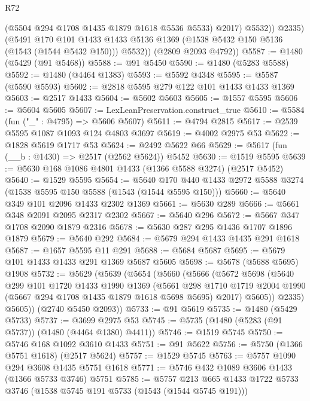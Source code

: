 \begin{lexlean}{R72}
\begin{coremodule}
                (@5504 @294 @1708 @1435 @1879 @1618 @5536 @5533)
                @2017)
              @5532))
          @2335)
        (@5491
          @170
          @101
          @1433
          @1433
          @5136
          @1369
          (@1538 @5432 @150 @5136 (@1543 (@1544 @5432 @150)))
          @5532))
      (@2809 @2093 @4792))
@5587 := @1480 (@5429 (@91 @5468))
@5588 := @91 @5450
@5590 := @1480 (@5283 @5588)
@5592 := @1480 (@4464 @1383)
@5593 := @5592 @4348
@5595 := @5587 (@5590 @5593)
@5602 := @2818 @5595 @279 @122 @101 @1433 @1433 @1369
@5603 := @2517 @1433
@5604 := @5602 @5603
@5605 := @1557 @5595
@5606 := @5604 @5605
@5607 := LexLeanPreservation.construct_true
@5610 := @5584 (fun ("_" : @4795) => @5606 @5607)
@5611 := @4794 @2815
@5617 := @2539 @5595 @1087 @1093 @124 @4803 @3697
@5619 := @4002 @2975 @53
@5622 := @1828 @5619 @1717 @53
@5624 := @2492 @5622 @66
@5629 := @5617 (fun (__b : @1430) => @2517 (@2562 @5624)) @5452
@5630 := @1519 @5595
@5639 := @5630 @168 @1086 @4801 @1433 (@1366 @5588 @3274) (@2517 @5452)
@5640 := @1529 @5595
@5654 := @5640 @170 @440 @1433 @2972 @5588 @3274 (@1538 @5595 @150 @5588 (@1543 (@1544 @5595 @150)))
@5660 := @5640 @349 @101 @2096 @1433 @2302 @1369
@5661 := @5630 @289
@5666 := @5661 @348 @2091 @2095 @2317 @2302
@5667 := @5640 @296
@5672 := @5667 @347 @1708 @2090 @1879 @2316
@5678 := @5630 @287 @295 @1436 @1707 @1896 @1879
@5679 := @5640 @292
@5684 := @5679 @294 @1433 @1435 @291 @1618
@5687 := @1657 @5595 @11 @291
@5688 := @5684 @5687
@5695 := @5679 @101 @1433 @1433 @291 @1369 @5687 @5605
@5698 := @5678 (@5688 @5695) @1908
@5732 := @5629
    (@5639
      (@5654
        (@5660
          (@5666
            (@5672
              @5698
              (@5640
                @299
                @101
                @1720
                @1433
                @1990
                @1369
                (@5661
                  @298
                  @1710
                  @1719
                  @2004
                  @1990
                  (@5667 @294 @1708 @1435 @1879 @1618 @5698 @5695)
                  @2017)
                @5605))
            @2335)
          @5605))
      (@2740 @5450 @2093))
@5733 := @91 @5619
@5735 := @1480 (@5429 @5733)
@5737 := @3699 @2975 @53
@5745 := @5735 (@1480 (@5283 (@91 @5737)) (@1480 (@4464 @1380) @4411))
@5746 := @1519 @5745
@5750 := @5746 @168 @1092 @3610 @1433
@5751 := @91 @5622
@5756 := @5750 (@1366 @5751 @1618) (@2517 @5624)
@5757 := @1529 @5745
@5763 := @5757 @1090 @294 @3608 @1435 @5751 @1618
@5771 := @5746 @432 @1089 @3606 @1433 (@1366 @5733 @3746) @5751
@5785 := @5757 @213 @665 @1433 @1722 @5733 @3746 (@1538 @5745 @191 @5733 (@1543 (@1544 @5745 @191)))

\end{coremodule}
\end{lexlean}
